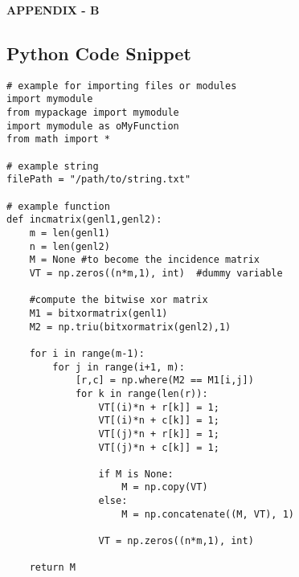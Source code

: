 \newpage
\thispagestyle{empty}
\begin{center}
    {\bfseries APPENDIX - B }
    \vspace{1\baselineskip}
\end{center}

\subsection*{Python Code Snippet} 


\begin{lstlisting}
# example for importing files or modules
import mymodule
from mypackage import mymodule
import mymodule as oMyFunction
from math import *

# example string
filePath = "/path/to/string.txt"

# example function
def incmatrix(genl1,genl2):
    m = len(genl1)
    n = len(genl2)
    M = None #to become the incidence matrix
    VT = np.zeros((n*m,1), int)  #dummy variable
    
    #compute the bitwise xor matrix
    M1 = bitxormatrix(genl1)
    M2 = np.triu(bitxormatrix(genl2),1) 

    for i in range(m-1):
        for j in range(i+1, m):
            [r,c] = np.where(M2 == M1[i,j])
            for k in range(len(r)):
                VT[(i)*n + r[k]] = 1;
                VT[(i)*n + c[k]] = 1;
                VT[(j)*n + r[k]] = 1;
                VT[(j)*n + c[k]] = 1;
                
                if M is None:
                    M = np.copy(VT)
                else:
                    M = np.concatenate((M, VT), 1)
                
                VT = np.zeros((n*m,1), int)
    
    return M
\end{lstlisting}


\clearpage{}